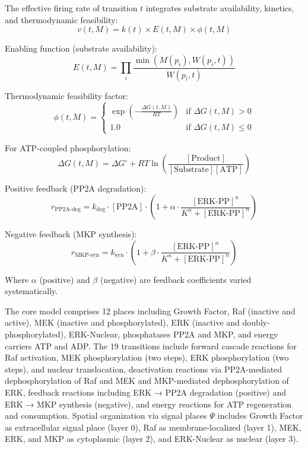 \documentclass[twocolumn,11pt]{article}
\begin{document}
The effective firing rate of transition $t$ integrates substrate availability, kinetics, and thermodynamic feasibility:
\begin{equation}
v(t, M) = k(t) \times E(t, M) \times \phi(t, M)
\end{equation}

Enabling function (substrate availability):
\begin{equation}
E(t, M) = \prod_{i} \frac{\min(M(p_i), W(p_i,t))}{W(p_i,t)}
\end{equation}

Thermodynamic feasibility factor:
\begin{equation}
\phi(t, M) = \begin{cases}
\exp\left(-\frac{\Delta G(t,M)}{RT}\right) & \text{if } \Delta G(t,M) > 0 \\
1.0 & \text{if } \Delta G(t,M) \leq 0
\end{cases}
\end{equation}

For ATP-coupled phosphorylation:
\begin{equation}
\Delta G(t,M) = \Delta G^\circ + RT \ln\left(\frac{[\text{Product}]}{[\text{Substrate}][\text{ATP}]}\right)
\end{equation}

Positive feedback (PP2A degradation):
{\small
\begin{equation}
r_{\text{PP2A-deg}} = k_{\text{deg}} \cdot [\text{PP2A}] \cdot \left(1 + \alpha \cdot \frac{[\text{ERK-PP}]^n}{K^n + [\text{ERK-PP}]^n}\right)
\end{equation}
}

Negative feedback (MKP synthesis):
\begin{equation}
r_{\text{MKP-syn}} = k_{\text{syn}} \cdot \left(1 + \beta \cdot \frac{[\text{ERK-PP}]^n}{K^n + [\text{ERK-PP}]^n}\right)
\end{equation}

Where $\alpha$ (positive) and $\beta$ (negative) are feedback coefficients varied systematically.

The core model comprises 12 places including Growth Factor, Raf (inactive and active), MEK (inactive and phosphorylated), ERK (inactive and doubly-phosphorylated), ERK-Nuclear, phosphatases PP2A and MKP, and energy carriers ATP and ADP. The 19 transitions include forward cascade reactions for Raf activation, MEK phosphorylation (two steps), ERK phosphorylation (two steps), and nuclear translocation, deactivation reactions via PP2A-mediated dephosphorylation of Raf and MEK and MKP-mediated dephosphorylation of ERK, feedback reactions including ERK → PP2A degradation (positive) and ERK → MKP synthesis (negative), and energy reactions for ATP regeneration and consumption. Spatial organization via signal places $\Psi$ includes Growth Factor as extracellular signal place (layer 0), Raf as membrane-localized (layer 1), MEK, ERK, and MKP as cytoplasmic (layer 2), and ERK-Nuclear as nuclear (layer 3).
\end{document}
